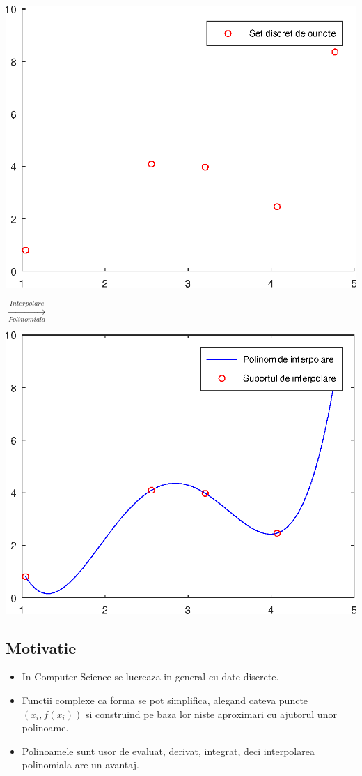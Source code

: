 \documentclass{article}
\begin{document}
\begin{minipage}{0.4\textwidth}
    \includegraphics[scale=0.5]{discrete_points_before}
\end{minipage}
{\LARGE$\xrightarrow[Polinomiala]{Interpolare}$}
\begin{minipage}{0.6\textwidth}
    \includegraphics[scale=0.5]{discrete_points_after}
\end{minipage}


\subsection{Motivatie}
\begin{itemize}
    \item In Computer Science se lucreaza in general cu date discrete.
    \item Functii complexe ca forma se pot simplifica, alegand cateva puncte $(x_i, f(x_i))$ si construind pe baza lor niste aproximari cu ajutorul unor polinoame.
    \item Polinoamele sunt usor de evaluat, derivat, integrat, deci interpolarea polinomiala are un avantaj.
\end{itemize}
\end{document}
